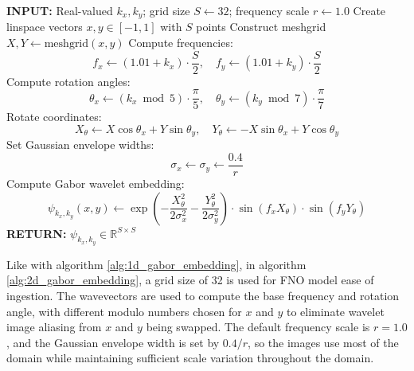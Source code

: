 \documentclass[preprint,review,12pt]{elsarticle}
\begin{document}
\begin{algorithm}[H]
\caption{2D Gabor Wavelet Embedding for Wavevectors}
\label{alg:2d_gabor_embedding}
\begin{algorithmic}[1]
\STATE \textbf{INPUT:} Real-valued \( k_x, k_y \); grid size \( S \leftarrow 32 \); frequency scale \( r \leftarrow 1.0 \)
\STATE Create linspace vectors \( x, y \in [-1, 1] \) with \( S \) points
\STATE Construct meshgrid \( X, Y \leftarrow \text{meshgrid}(x, y) \)
\STATE Compute frequencies:
\[
f_x \leftarrow (1.01 + k_x) \cdot \frac{S}{2}, \quad f_y \leftarrow (1.01 + k_y) \cdot \frac{S}{2}
\]
\STATE Compute rotation angles:
\[
\theta_x \leftarrow (k_x \bmod 5) \cdot \frac{\pi}{5}, \quad \theta_y \leftarrow (k_y \bmod 7) \cdot \frac{\pi}{7}
\]
\STATE Rotate coordinates:
\[
X_\theta \leftarrow X \cos \theta_x + Y \sin \theta_y, \quad
Y_\theta \leftarrow -X \sin \theta_x + Y \cos \theta_y
\]
\STATE Set Gaussian envelope widths:
\[
\sigma_x \leftarrow \sigma_y \leftarrow \frac{0.4}{r}
\]
\STATE Compute Gabor wavelet embedding:
\[
\psi_{k_x, k_y}(x, y) \leftarrow
\exp\left(-\frac{X_\theta^2}{2 \sigma_x^2} - \frac{Y_\theta^2}{2 \sigma_y^2}\right)
\cdot \sin(f_x X_\theta) \cdot \sin(f_y Y_\theta)
\]
\STATE \textbf{RETURN:} \( \psi_{k_x, k_y} \in \mathbb{R}^{S \times S} \)
\end{algorithmic}
\end{algorithm}

Like with algorithm \ref{alg:1d_gabor_embedding}, in algorithm \ref{alg:2d_gabor_embedding}, a grid size of 32 is used for FNO model ease of ingestion. The wavevectors are used to compute the base frequency and rotation angle, with different modulo numbers chosen for $x$ and $y$ to eliminate wavelet image aliasing from $x$ and $y$ being swapped. The default frequency scale is $r=1.0$, and the Gaussian envelope width is set by \(0.4/r\), so the images use most of the domain while maintaining sufficient scale variation throughout the domain.
\end{document}
